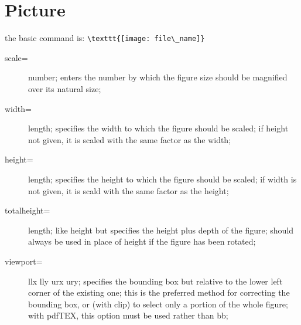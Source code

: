\documentclass[a4paper,12pt,twoside]{book}
\begin{document}
	\section{Picture}
		the basic command is:
		\verb!\texttt{[image: file\_name]}!
		
		\begin{description}
		\item [scale=] number; enters the number by which the figure size should be magnified over its natural size;
		\item [width=] length; specifies the width to which the figure should be scaled; if height not given, it is scaled with the same factor as the width;
		\item [height=] length; specifies the height to which the figure should be scaled; if width is not given, it is scald with the same factor as the height;
		\item [totalheight=] length; like height but specifies the height plus depth of the figure; should always be used in place of height if the figure has been rotated;
		\item [viewport=] llx lly urx ury; specifies the bounding box but relative to the lower left corner of the existing one; this is the preferred method for correcting the bounding box, or (with clip) to select only a portion of the whole figure; with pdfTEX, this option must be used rather than bb;
		\end{description}
\end{document}
